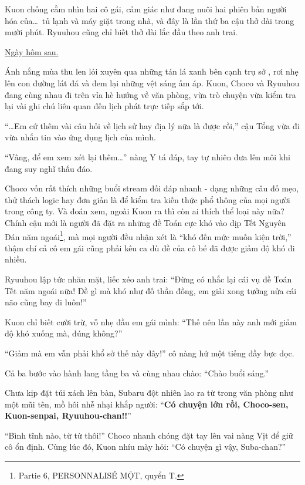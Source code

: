 \documentclass[../main.tex]{subfiles}
\begin{document}
Kuon chống cằm nhìn hai cô gái, cảm giác như đang nuôi hai phiên bản người hóa của\dots\ tủ lạnh và máy giặt trong nhà, và đây là lần thứ ba cậu thở dài trong mười phút. Ryuuhou cũng chỉ biết thở dài lắc đầu theo anh trai.

\begin{center}
  \uline{Ngày hôm sau.}
\end{center}

Ánh nắng mùa thu len lỏi xuyên qua những tán lá xanh bên cạnh trụ sở \hll, rơi nhẹ lên con đường lát đá và đem lại những vệt sáng ấm áp. Kuon, Choco và Ryuuhou đang cùng nhau đi trên vỉa hè hướng về văn phòng, vừa trò chuyện vừa kiểm tra lại vài ghi chú liên quan đến lịch phát trực tiếp sắp tới.

``\dots Em cứ thêm vài câu hỏi về lịch sử hay địa lý nữa là được rồi,'' cậu Tổng vừa đi vừa nhắn tin vào ứng dụng lịch của mình.

``Vâng, để em xem xét lại thêm\dots'' nàng Y tá đáp, tay tự nhiên đưa lên môi khi đang suy nghĩ thấu đáo.

Choco vốn rất thích những buổi stream đối đáp nhanh - dạng những câu đố mẹo, thử thách logic hay đơn giản là để kiểm tra kiến thức phổ thông của mọi người trong công ty. Và đoán xem, ngoài Kuon ra thì còn ai thích thể loại này nữa? Chính cậu mới là người đã đặt ra những đề Toán cực khó vào dịp Tết Nguyên Đán năm ngoái\footnote{{\sen Partie 6}, {\flaregothic PERSONNALISÉ \vnmdisp MỘT}, quyển T.}, mà mọi người đều nhận xét là ``khó đến mức muốn kiện trời,'' thậm chí cả cô em gái cũng phải kêu ca dù đề của cô bé đã được giảm độ khó đi nhiều.

Ryuuhou lập tức nhăn mặt, liếc xéo anh trai: ``Đừng có nhắc lại cái vụ đề Toán Tết năm ngoái nữa! Đề gì mà khó như đố thần đồng, em giải xong tưởng nửa cái não cũng bay đi luôn!''

Kuon chỉ biết cười trừ, vỗ nhẹ đầu em gái mình: ``Thế nên lần này anh mới giảm độ khó xuống mà, đúng không?''

``Giảm mà em vẫn phải khổ sở thế này đây!'' cô nàng hứ một tiếng đầy bực dọc.

Cả ba bước vào hành lang tầng ba và cùng nhau chào: ``Chào buổi sáng.''

Chưa kịp đặt túi xách lên bàn, Subaru đột nhiên lao ra từ trong văn phòng như một mũi tên, mồ hôi nhễ nhại khắp người: ``\textbf{Có chuyện lớn rồi, Choco-sen, Kuon-senpai, Ryuuhou-chan!!}''

``Bình tĩnh nào, từ từ thôi!'' Choco nhanh chóng đặt tay lên vai nàng Vịt để giữ cô ổn định. Cùng lúc đó, Kuon nhíu mày hỏi: ``Có chuyện gì vậy, Suba-chan?''
\end{document}
